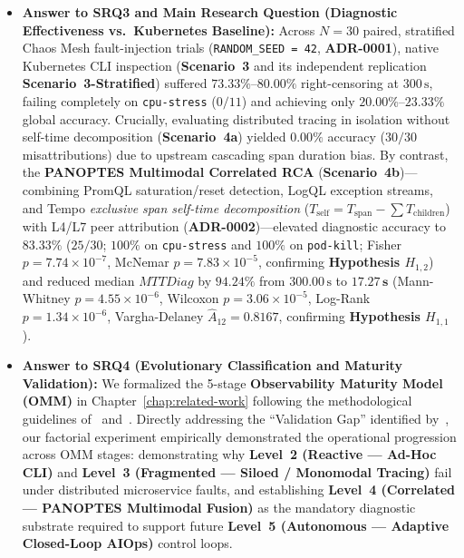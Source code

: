 \begin{itemize}
    \item \textbf{Answer to SRQ3 and Main Research Question (Diagnostic Effectiveness vs.\ Kubernetes Baseline):} Across $N=30$ paired, stratified Chaos Mesh fault-injection trials (\texttt{RANDOM\_SEED = 42}, \textbf{ADR-0001}), native Kubernetes CLI inspection (\textbf{Scenario~3} and its independent replication \textbf{Scenario~3-Stratified}) suffered $73.33\%\text{--}80.00\%$ right-censoring at $300\,\text{s}$, failing completely on \texttt{cpu-stress} ($0/11$) and achieving only $20.00\%\text{--}23.33\%$ global accuracy. Crucially, evaluating distributed tracing in isolation without self-time decomposition (\textbf{Scenario~4a}) yielded $\mathbf{0.00\%}$ accuracy ($30/30$ misattributions) due to upstream cascading span duration bias. By contrast, the \textbf{PANOPTES Multimodal Correlated RCA} (\textbf{Scenario~4b})---combining PromQL saturation/reset detection, LogQL exception streams, and Tempo \textit{exclusive span self-time decomposition} ($T_{\text{self}} = T_{\text{span}} - \sum T_{\text{children}}$) with L4/L7 peer attribution (\textbf{ADR-0002})---elevated diagnostic accuracy to $\mathbf{83.33\%}$ ($25/30$; $100\%$ on \texttt{cpu-stress} and $100\%$ on \texttt{pod-kill}; Fisher $p = 7.74 \times 10^{-7}$, McNemar $p = 7.83 \times 10^{-5}$, confirming \textbf{Hypothesis $H_{1,2}$}) and reduced median $MTTDiag$ by $\mathbf{94.24\%}$ from $300.00\,\text{s}$ to $\mathbf{17.27\,\text{s}}$ (Mann-Whitney $p = 4.55 \times 10^{-6}$, Wilcoxon $p = 3.06 \times 10^{-5}$, Log-Rank $p = 1.34 \times 10^{-6}$, Vargha-Delaney $\hat{A}_{12} = 0.8167$, confirming \textbf{Hypothesis $H_{1,1}$}).

    \item \textbf{Answer to SRQ4 (Evolutionary Classification and Maturity Validation):} We formalized the 5-stage \textbf{Observability Maturity Model (OMM)} in Chapter~\ref{chap:related-work} following the methodological guidelines of~ and~. Directly addressing the ``Validation Gap'' identified by~, our factorial experiment empirically demonstrated the operational progression across OMM stages: demonstrating why \textbf{Level~2 (Reactive --- Ad-Hoc CLI)} and \textbf{Level~3 (Fragmented --- Siloed / Monomodal Tracing)} fail under distributed microservice faults, and establishing \textbf{Level~4 (Correlated --- PANOPTES Multimodal Fusion)} as the mandatory diagnostic substrate required to support future \textbf{Level~5 (Autonomous --- Adaptive Closed-Loop AIOps)} control loops.
\end{itemize}

